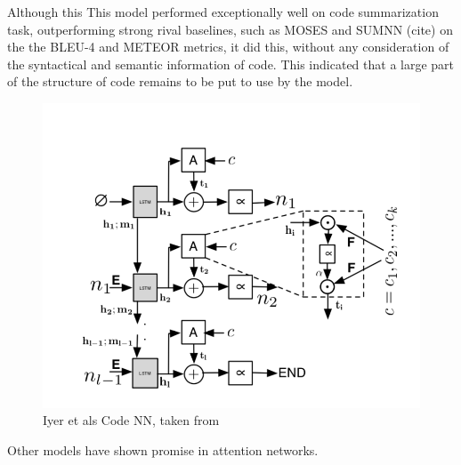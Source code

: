 Although this This model performed exceptionally well on code summarization task, outperforming strong rival baselines, such as MOSES and SUMNN (cite) on the the BLEU-4 and METEOR metrics, it did this, without any consideration of the syntactical and semantic information of code. This indicated that a large part of the structure of code remains to be put to use by the model.
\begin{figure}[tb]
    \centering
    \includegraphics[width=0.5\linewidth]{ModelPics/Iyer_etal.png}
    \caption{Iyer et als Code NN, taken from \cite{iyer_summarizing_2016}}
    \label{fig:Iyer}
\end{figure}

Other models have shown promise in attention networks.









